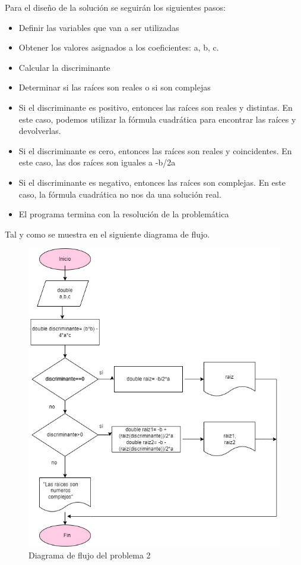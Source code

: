 \documentclass{IEEEcsmag}
\begin{document}
Para el diseño de la solución se seguirán los siguientes pasos:
\begin{itemize}
    \item Definir las variables que van a ser utilizadas 
    \item Obtener los valores asignados a los coeficientes: a, b, c. 
    \item Calcular la discriminante
    \item Determinar si las raíces son reales o si son complejas 
    \item Si el discriminante es positivo, entonces las raíces son reales y distintas. En este caso, podemos utilizar la fórmula cuadrática para encontrar las raíces y devolverlas.
    \item Si el discriminante es cero, entonces las raíces son reales y coincidentes. En este caso, las dos raíces son iguales a -b/2a
    \item Si el discriminante es negativo, entonces las raíces son complejas. En este caso, la fórmula cuadrática no nos da una solución real. 
    \item El programa termina con la resolución de la problemática 
\end{itemize}

Tal y como se muestra en el siguiente diagrama de flujo.

\begin{figure}[h!]
    \centering
    \includegraphics[width = 8 cm]{./latex-imagenes/DiagramaFlujo2.jpg}
    \caption{Diagrama de flujo del problema 2}
    \label{fig:Diagramadeflujode2 problema2}
\end{figure}
\end{document}
